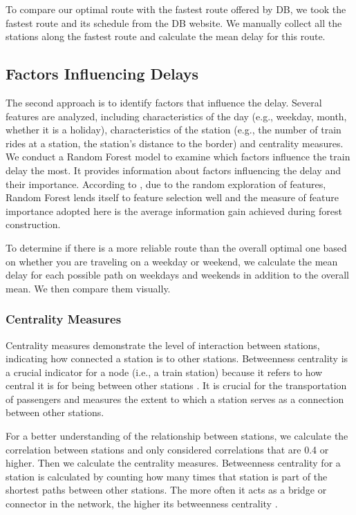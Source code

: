 \documentclass{article}
\theoremstyle{plain}
\theoremstyle{definition}
\theoremstyle{remark}
\begin{document}
To compare our optimal route with the fastest route offered by DB, we took the fastest route and its schedule from the DB website. We manually collect all the stations along the fastest route and calculate the mean delay for this route.


\subsection{Factors Influencing Delays}\label{sec:methods_ext}

The second approach is to identify factors that influence the delay.  Several features are analyzed, including characteristics of the day (e.g., weekday, month, whether it is a holiday), characteristics of the station (e.g., the number of train rides at a station, the station's distance to the border) and centrality measures. We conduct a Random Forest model to examine which factors influence the train delay the most. It provides information about factors influencing the delay and their importance. According to \citet{rogers2006identifying}, due to the random exploration of features, Random Forest lends itself to feature selection well and the measure of feature importance adopted here is the average information gain achieved during forest construction.

To determine if there is a more reliable route than the overall optimal one based on whether you are traveling on a weekday or weekend, we calculate the mean delay for each possible path on weekdays and weekends in addition to the overall mean. We then compare them visually.

\subsubsection{Centrality Measures}

Centrality measures demonstrate the level of interaction between stations, indicating how connected a station is to other stations. Betweenness centrality is a crucial indicator for a node (i.e., a train station) because it refers to how central it is for being between other stations \cite{betweenness}. It is crucial for the transportation of passengers \cite{centrality} and measures the extent to which a station serves as a connection between other stations.

For a better understanding of the relationship between stations, we calculate the correlation between stations and only considered correlations that are 0.4 or higher. Then we calculate the centrality measures. Betweenness centrality for a station is calculated by counting how many times that station is part of the shortest paths between other stations. The more often it acts as a bridge or connector in the network, the higher its betweenness centrality \cite{centrality}.
\end{document}
